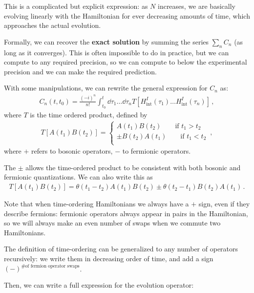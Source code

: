 \documentclass[main.tex]{subfiles}
\begin{document}
This is a complicated but explicit expression: as \(N\) increases, we are basically evolving linearly with the Hamiltonian for ever decreasing amounts of time, which approaches the actual evolution. 

Formally, we can recover the \textbf{exact solution} by summing the series \(\sum _{n} C_n\) (as long as it converges). 
This is often impossible to do in practice, but we can compute to any required precision, so we can compute to below the experimental precision and we can make the required prediction. 

\begin{claim}
With some manipulations, we can rewrite the general expression for \(C_n\) as: 
%
\begin{align}
C_n (t, t_0 ) = \frac{(-i)^{n}}{n!} 
\int_{t_0 }^{t} \dd{\tau_1} \dots \dd{\tau_n} T [H _{\text{int}}^{I} (\tau_1 ) \dots H _{\text{int}}^{I}(\tau_{n})] 
\,,
\end{align}
%
where \(T\) is the time ordered product, defined by 
%
\begin{align}
T[A(t_1 ) B(t_2 )]
= \begin{cases}
    A(t_1 ) B(t_2 ) \qquad \text{if } t_1 > t_2 \\
    \pm B(t_2 ) A(t_1 ) \qquad \text{if } t_1 < t_2 \\
\end{cases}
\,,
\end{align}
%
where \(+\) refers to bosonic operators, \(-\) to fermionic operators.
\end{claim}

The \(\pm\) allows the time-ordered product to be consistent with both bosonic and fermionic quantizations. 
We can also write this as 
%
\begin{align}
T[A(t_1 ) B(t_2 )]
= \theta (t_1 - t_2 ) A(t_1 ) B(t_2 )
\pm \theta (t_2 - t_1 ) B(t_2 ) A(t_1 )
\,.
\end{align}

Note that when time-ordering Hamiltonians we always have a \(+\) sign, even if they describe fermions: fermionic operators always appear in pairs in the Hamiltonian, so we will always make an even number of swaps when we commute two Hamiltonians. 

The definition of time-ordering can be generalized to any number of operators recursively: we write them in decreasing order of time, and add a sign \((-)^{\text{\# of fermion operator swaps}}\). 

Then, we can write a full expression for the evolution operator: 
%
%
\end{document}

